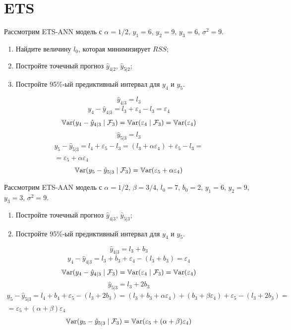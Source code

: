 \chapter{ETS}


\begin{problem}
  Рассмотрим ETS-ANN модель с $\alpha = 1/2$, $y_1=6$, $y_2=9$, $y_3 = 6$, $\sigma^2=9$.


  \begin{enumerate}
    \item Найдите величину $l_0$, которая минимизирует $RSS$;
    \item Постройте точечный прогноз $\hat y_{4|2}$, $\hat y_{5|2}$;
     \item Постройте 95\%-ый предиктивный интервал для $y_{4}$ и $y_{5}$.
  \end{enumerate}
\begin{sol}
  \[
    \hat y_{4|3} = l_3 
  \]
  \[
    y_4 - \hat y_{4|3} = l_3 + \varepsilon_4 - l_3 = \varepsilon_4  
  \]
  \[
  \operatorname{\mathbb{V}\mathrm{ar}}(y_4 - \hat y_{4|3} \mid \mathcal{F}_3) = \operatorname{\mathbb{V}\mathrm{ar}}(\varepsilon_4 \mid \mathcal{F}_3) = \operatorname{\mathbb{V}\mathrm{ar}}(\varepsilon_4)  
  \]
  \[
  \hat y_{5|3} = l_3 
  \]
  \begin{multline}
  y_5 - \hat y_{5|3} = l_4  + \varepsilon_5 - l_3  = (l_3 + \alpha \varepsilon_4)  + 
   \varepsilon_5 - l_3 = \\
  = \varepsilon_5 + \alpha  \varepsilon_4 
  \end{multline}
  \[
  \operatorname{\mathbb{V}\mathrm{ar}}(y_5 - \hat y_{5|3} \mid \mathcal{F}_3) = \operatorname{\mathbb{V}\mathrm{ar}}(\varepsilon_5 + \alpha  \varepsilon_4 )  
  \]
    
\end{sol}
\end{problem}

\begin{problem}
  Рассмотрим ETS-AAN модель с $\alpha = 1/2$, $\beta=3/4$, $l_{0}=7$, $b_0=2$, $y_1=6$, $y_2=9$, $y_3=3$, $\sigma^2=9$.
  \begin{enumerate}
    \item Постройте точечный прогноз $\hat y_{4|3}$, $\hat y_{5|3}$;
    \item Постройте 95\%-ый предиктивный интервал для $y_{4}$ и $y_{5}$.
  \end{enumerate}
\begin{sol}
\[
\hat y_{4|3} = l_3 + b_3
\]
\[
y_4 - \hat y_{4|3} = l_3 + b_3 + \varepsilon_4 - (l_3 + b_3) = \varepsilon_4  
\]
\[
\operatorname{\mathbb{V}\mathrm{ar}}(y_4 - \hat y_{4|3} \mid \mathcal{F}_3) = \operatorname{\mathbb{V}\mathrm{ar}}(\varepsilon_4 \mid \mathcal{F}_3) = \operatorname{\mathbb{V}\mathrm{ar}}(\varepsilon_4)  
\]
\[
\hat y_{5|3} = l_3 + 2b_3
\]
\begin{multline}
y_5 - \hat y_{5|3} = l_4 + b_4 + \varepsilon_5 - (l_3 + 2b_3) = (l_3 + b_3 + \alpha \varepsilon_4)  + 
(b_3 + \beta \varepsilon_4) + \varepsilon_5 - (l_3 + 2b_3) = \\
= \varepsilon_5 + (\alpha + \beta) \varepsilon_4 
\end{multline}
\[
\operatorname{\mathbb{V}\mathrm{ar}}(y_5 - \hat y_{5|3} \mid \mathcal{F}_3) = \operatorname{\mathbb{V}\mathrm{ar}}(\varepsilon_5 + (\alpha + \beta) \varepsilon_4 )  
\]
\end{sol}
\end{problem}

